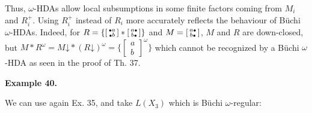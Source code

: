 \documentclass[10pt,a4paper]{article}
\begin{document}
Thus, $\omega$-HDAs allow local subsumptions in some finite factors coming from $M_{i}$ and $R_{i}^{+}$. Using $R_{i}^{+}$ instead of $R_{i}$ more accurately reflects the behaviour of Büchi $\omega$-HDAs. Indeed, for $R={\{\left[\begin{smallmatrix}\vbox{\hbox{\tiny$\bullet$}}a\\
\vbox{\hbox{\tiny$\bullet$}}b\end{smallmatrix}\right]*\left[\begin{smallmatrix}a\vbox{\hbox{\tiny$\bullet$}}\\
b\vbox{\hbox{\tiny$\bullet$}}\end{smallmatrix}\right]\}}$ and $M=\left[\begin{smallmatrix}a\vbox{\hbox{\tiny$\bullet$}}\\
b\vbox{\hbox{\tiny$\bullet$}}\end{smallmatrix}\right]$, $M$ and $R$ are down-closed, but $M*R^{\omega}=M\mathord{\downarrow}*(R\mathord{\downarrow})^{\omega}={\{\left[\begin{smallmatrix}a\\
b\end{smallmatrix}\right]^{\omega}\}}$ which cannot be recognized by a Büchi $\omega$-HDA as seen in the proof of Th. 37.\par
 
 
 
\par\medskip\noindent\textbf{Example 40.}\par
 
 
We can use again Ex. 35, and take $L(X_{3})$ which is Büchi $\omega$-regular:\par
 
\end{document}
